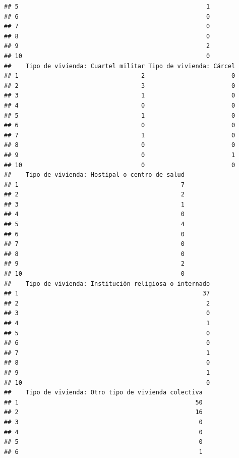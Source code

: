 \documentclass[11pt,]{article}
\begin{document}
\begin{verbatim}
## 5                                                    1
## 6                                                    0
## 7                                                    0
## 8                                                    0
## 9                                                    2
## 10                                                   0
##    Tipo de vivienda: Cuartel militar Tipo de vivienda: Cárcel
## 1                                  2                        0
## 2                                  3                        0
## 3                                  1                        0
## 4                                  0                        0
## 5                                  1                        0
## 6                                  0                        0
## 7                                  1                        0
## 8                                  0                        0
## 9                                  0                        1
## 10                                 0                        0
##    Tipo de vivienda: Hostipal o centro de salud
## 1                                             7
## 2                                             2
## 3                                             1
## 4                                             0
## 5                                             4
## 6                                             0
## 7                                             0
## 8                                             0
## 9                                             2
## 10                                            0
##    Tipo de vivienda: Institución religiosa o internado
## 1                                                   37
## 2                                                    2
## 3                                                    0
## 4                                                    1
## 5                                                    0
## 6                                                    0
## 7                                                    1
## 8                                                    0
## 9                                                    1
## 10                                                   0
##    Tipo de vivienda: Otro tipo de vivienda colectiva
## 1                                                 50
## 2                                                 16
## 3                                                  0
## 4                                                  0
## 5                                                  0
## 6                                                  1

\end{verbatim}
\end{document}
